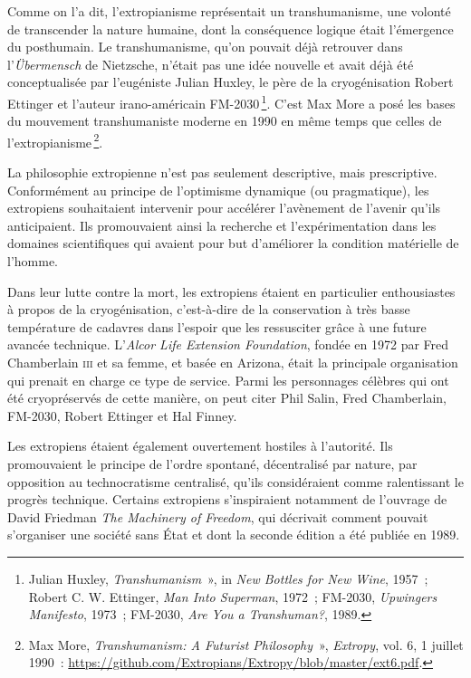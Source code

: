 \documentclass[a4paper,notitlepage]{article}
\newcommand{\eng}[1]{{\NoAutoSpaceBeforeFDP\emph{#1}}}  %
\newcommand{\sfootnote}{\,\footnote}
\begin{document}
Comme on l'a dit, l'extropianisme représentait un transhumanisme, une volonté de transcender la nature humaine, dont la conséquence logique était l'émergence du posthumain. Le transhumanisme, qu'on pouvait déjà retrouver dans l'\eng{Übermensch} de Nietzsche, n'était pas une idée nouvelle et avait déjà été conceptualisée par l'eugéniste Julian Huxley, le père de la cryogénisation Robert Ettinger et l'auteur irano-américain FM-2030\sfootnote{Julian Huxley, \eng{Transhumanism}~», in \eng{New Bottles for New Wine}, 1957~; Robert C. W. Ettinger, \eng{Man Into Superman}, 1972~; FM-2030, \eng{Upwingers Manifesto}, 1973~; FM-2030, \eng{Are You a Transhuman?}, 1989.}. C'est Max More a posé les bases du mouvement transhumaniste moderne en 1990 en même temps que celles de l'extropianisme\sfootnote{Max More, \eng{Transhumanism: A Futurist Philosophy}~», \eng{Extropy}, vol. 6, 1\ier{} juillet 1990~: \url{https://github.com/Extropians/Extropy/blob/master/ext6.pdf}.}. %

La philosophie extropienne n'est pas seulement descriptive, mais prescriptive. Conformément au principe de l'optimisme dynamique (ou pragmatique), les extropiens souhaitaient intervenir pour accélérer l'avènement de l'avenir qu'ils anticipaient. Ils promouvaient ainsi la recherche et l'expérimentation dans les domaines scientifiques qui avaient pour but d'améliorer la condition matérielle de l'homme.

Dans leur lutte contre la mort, les extropiens étaient en particulier enthousiastes à propos de la cryogénisation, c'est-à-dire de la conservation à très basse température de cadavres dans l'espoir que les ressusciter grâce à une future avancée technique. L'\eng{Alcor Life Extension Foundation}, fondée en 1972 par Fred Chamberlain \textsc{iii} et sa femme, et basée en Arizona, était la principale organisation qui prenait en charge ce type de service. Parmi les personnages célèbres qui ont été cryopréservés de cette manière, on peut citer Phil Salin, Fred Chamberlain, FM-2030, Robert Ettinger et Hal Finney.

Les extropiens étaient également ouvertement hostiles à l'autorité. Ils promouvaient le principe de l'ordre spontané, décentralisé par nature, par opposition au technocratisme centralisé, qu'ils considéraient comme ralentissant le progrès technique. Certains extropiens s'inspiraient notamment de l'ouvrage de David Friedman \eng{The Machinery of Freedom}, qui décrivait comment pouvait s'organiser une société sans État et dont la seconde édition a été publiée en 1989.
\end{document}

